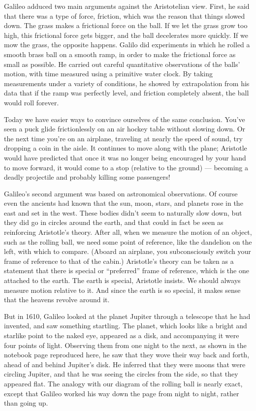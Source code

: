 \begin{figure}
\end{figure}

Galileo adduced two main arguments against the Aristotelian view. First, he said
that there was a type of force, friction, which was the reason that things slowed down.
The grass makes a frictional force on the ball. If we let the grass grow too high,
this frictional force gets bigger, and the ball decelerates more quickly. If we mow
the grass, the opposite happens. Galilo did experiments in which he rolled a smooth
brass ball on a smooth ramp, in order to make the frictional force as small as possible.
He carried out careful quantitative observations of the balls' motion, with time
measured using a primitive water clock. By taking measurements under a variety of
conditions, he showed by extrapolation from his data that if the ramp was perfectly level,
and friction completely absent, the ball would roll forever. 

Today we have easier ways
to convince ourselves of the same conclusion. You've seen a puck glide frictionlessly on an air hockey table
without slowing down. Or the next time you're on an airplane, traveling at nearly the speed of sound,
try dropping a coin in the aisle. It continues to move along with the plane; Aristotle would
have predicted that once it was no longer being encouraged by your hand to move forward, it
would come to a stop (relative to the ground) --- becoming a deadly projectile and probably killing
some passengers!

Galileo's second argument was based on astronomical observations. Of course even the ancients
had known that the sun, moon, stars, and planets rose in the east and set in the west. These bodies
didn't seem to naturally slow down, but they did go in circles around the earth, and that
could in fact be seen as reinforcing Aristotle's theory. After all, when we measure the motion
of an object, such as the rolling ball, we need some point of reference, like the dandelion on
the left, with which to compare. (Aboard an airplane, you subconsciously switch your frame of
reference to that of the cabin.) Aristotle's theory can be taken as a statement that there is
special or ``preferred'' frame of reference, which is the one attached to the earth. The earth
is special, Aristotle insists. We should always measure motion relative to it. And since the earth is
so special, it makes sense that the heavens revolve around it.

But in 1610, Galileo looked at the planet Jupiter through a telescope that he had invented, and
saw something startling. The planet, which looks like a bright and starlike point to the naked eye,
appeared as a disk, and accompanying it were four points of light. Observing them from one
night to the next, as shown in the notebook page reproduced here, he saw that they wove their
way back and forth, ahead of and behind Jupiter's disk. He inferred that they were moons
that were circling Jupiter, and that he was seeing the circles from the side, so
that they appeared flat. The analogy with our diagram of the rolling ball is nearly exact,
except that Galileo worked his way down the page from night to night, rather than going up.

